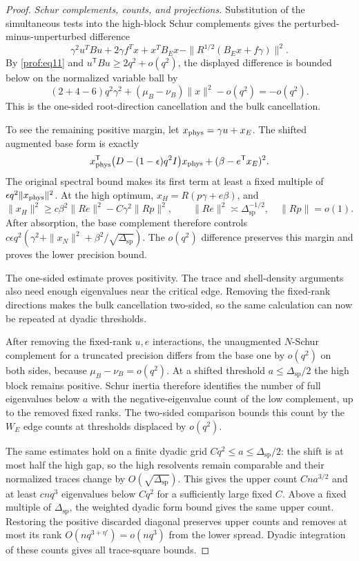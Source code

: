 \begin{proof}
\par\smallskip\noindent\textit{Schur complements, counts, and projections.}\enspace
Substitution of the simultaneous tests into the high-block Schur
complements gives the perturbed-minus-unperturbed difference
\[
 \gamma^2 u^TB u+2\gamma f^Tx+x^T B_E x-\|R^{1/2}(B_E x+f\gamma)\|^2.
\]
By \eqref{prof:eq11} and $u^{\mathsf T}Bu\ge2q^2+o(q^2)$, the displayed
difference is bounded below on the normalized variable ball by
\[
 (2+4-6)q^2\gamma^2+(\mu_B-\nu_B)\|x\|^2-o(q^2)=-o(q^2).
\]
This is the one-sided root-direction cancellation and the bulk cancellation.

To see the remaining positive margin, let
$x_{\rm phys}=\gamma u+x_E$. The shifted augmented base form is exactly
\[
 x_{\rm phys}^{\mathsf T}
     \bigl(D-(1-\epsilon)q^2I\bigr)x_{\rm phys}
       +(\beta-e^{\mathsf T}x_E)^2.
\]
The original spectral bound makes its first term at least a fixed
multiple of $\epsilon q^2\|x_{\rm phys}\|^2$. At the high optimum,
$x_H=R(p\gamma+e\beta)$, and
\[
 \|x_H\|^2\ge c\beta^2\|Re\|^2-C\gamma^2\|Rp\|^2,
 \qquad \|Re\|^2\asymp\Delta_{\mathrm{sp}}^{-1/2},\quad
 \|Rp\|=o(1).
\]
After absorption, the base complement therefore controls
$c\epsilon q^2(\gamma^2+\|x_N\|^2+
\beta^2/\sqrt{\Delta_{\mathrm{sp}}})$. The $o(q^2)$ difference
preserves this margin and proves the lower precision bound.

The one-sided estimate proves positivity. The trace and shell-density
arguments also need enough eigenvalues near the critical edge. Removing
the fixed-rank directions makes the bulk cancellation two-sided, so the
same calculation can now be repeated at dyadic thresholds.

After removing the fixed-rank $u,e$ interactions, the unaugmented
$N$-Schur complement for a truncated precision differs from the base
one by $o(q^2)$ on both sides, because $\mu_B-\nu_B=o(q^2)$.
At a shifted threshold $a\le\Delta_{\mathrm{sp}}/2$ the high block
remains positive. Schur inertia therefore identifies the number of
full eigenvalues below $a$ with the negative-eigenvalue count of the
low complement, up to the removed fixed ranks. The two-sided comparison
bounds this count by the $W_E$ edge counts at thresholds displaced by
$o(q^2)$.

The same estimates hold on a finite dyadic grid
$Cq^2\le a\le\Delta_{\mathrm{sp}}/2$: the shift is at most half the
high gap, so the high resolvents remain comparable and their normalized
traces change by $O(\sqrt{\Delta_{\mathrm{sp}}})$. This gives the
upper count $Cna^{3/2}$ and at least $cnq^3$ eigenvalues below
$Cq^2$ for a sufficiently large fixed $C$. Above a fixed multiple of
$\Delta_{\mathrm{sp}}$, the weighted dyadic form bound gives the same
upper count. Restoring the positive discarded diagonal preserves upper
counts and removes at most its rank $O(nq^{3+\eta'})=o(nq^3)$ from
the lower spread. Dyadic integration of these counts gives all
trace-square bounds.


\end{proof}
